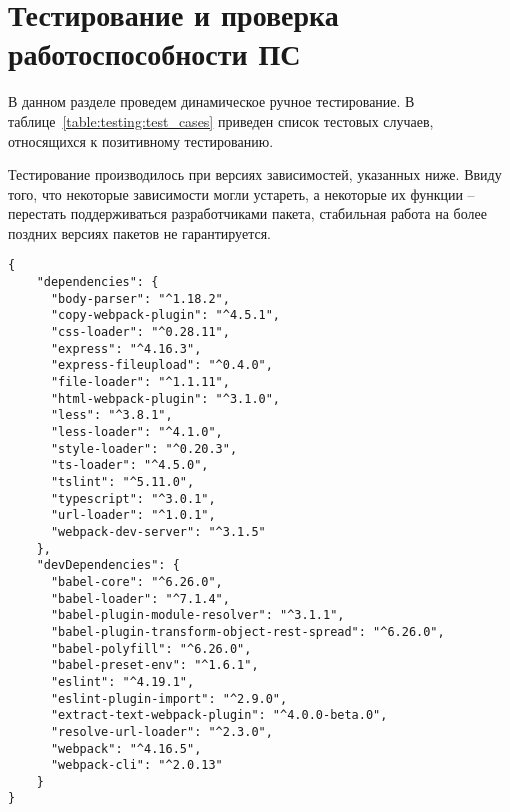 \section{Тестирование и проверка работоспособности ПС}
\label{sec:testing}

В данном разделе проведем динамическое ручное тестирование. В таблице~\ref{table:testing:test_cases} приведен список тестовых случаев, относящихся к позитивному тестированию.

Тестирование производилось при версиях зависимостей, указанных ниже. Ввиду того, что некоторые зависимости могли устареть, а некоторые их функции -- перестать поддерживаться разработчиками пакета, стабильная работа на более поздних версиях пакетов не гарантируется.

\begin{lstlisting}
{
	"dependencies": {
      "body-parser": "^1.18.2",
      "copy-webpack-plugin": "^4.5.1",
      "css-loader": "^0.28.11",
      "express": "^4.16.3",
      "express-fileupload": "^0.4.0",
      "file-loader": "^1.1.11",
      "html-webpack-plugin": "^3.1.0",
      "less": "^3.8.1",
      "less-loader": "^4.1.0",
      "style-loader": "^0.20.3",
      "ts-loader": "^4.5.0",
      "tslint": "^5.11.0",
      "typescript": "^3.0.1",
      "url-loader": "^1.0.1",
      "webpack-dev-server": "^3.1.5"
	},
	"devDependencies": {
      "babel-core": "^6.26.0",
      "babel-loader": "^7.1.4",
      "babel-plugin-module-resolver": "^3.1.1",
      "babel-plugin-transform-object-rest-spread": "^6.26.0",
      "babel-polyfill": "^6.26.0",
      "babel-preset-env": "^1.6.1",
      "eslint": "^4.19.1",
      "eslint-plugin-import": "^2.9.0",
      "extract-text-webpack-plugin": "^4.0.0-beta.0",
      "resolve-url-loader": "^2.3.0",
      "webpack": "^4.16.5",
      "webpack-cli": "^2.0.13"
	}
}
\end{lstlisting}

\newcommand\testnumber{\stepcounter{testnumber}\arabic{testnumber}}

\renewcommand{\labelenumi}{\arabic{enumi})}
\renewcommand{\labelenumii}{\asbuk{enumii})}

